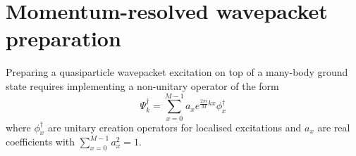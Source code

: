 \documentclass[aps,floatfix,10pt,amssymb,amsfont,amsmath,superscriptaddress,float,nofootinbib,longbibliography,nobalancelastpage,twocolumn]{revtex4-2}
\begin{document}


\section{Momentum-resolved wavepacket preparation}
\label{section:localized_wavepacket}
Preparing a quasiparticle wavepacket excitation on top of a many-body ground state requires implementing a non-unitary operator of the form
\begin{equation}
    \Psi_k^{\dagger} = \sum_{x=0}^{M-1} a_xe^{\frac{2\pi i}{M}kx} \phi^{\dagger}_x
\end{equation}
where $\phi^{\dagger}_x$ are unitary creation operators for localised excitations and $a_x$ are real coefficients with $\sum_{x=0}^{M-1} a_x^2 =1$.
\end{document}
